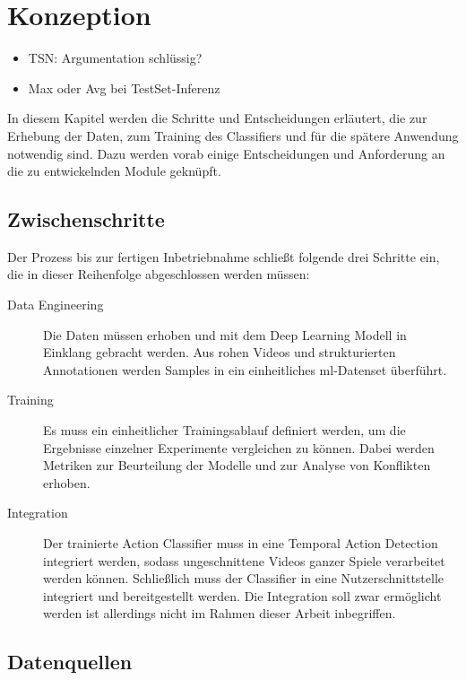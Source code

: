 \chapter{Konzeption}
\label{ch:concept}

\begin{tcolorbox}[title=Todo]
    \begin{itemize}
        \item TSN: Argumentation schlüssig?
        \item Max oder Avg bei TestSet-Inferenz
    \end{itemize}
\end{tcolorbox}

In diesem Kapitel werden die Schritte und Entscheidungen erläutert, die zur Erhebung der Daten, zum Training des Classifiers und für die spätere Anwendung notwendig sind.
Dazu werden vorab einige Entscheidungen und Anforderung an die zu entwickelnden Module geknüpft.

\section{Zwischenschritte}
\label{sec:steps}

Der Prozess bis zur fertigen Inbetriebnahme schließt folgende drei Schritte ein, die in dieser Reihenfolge abgeschlossen werden müssen:

\begin{description}
    \item[Data Engineering] Die Daten müssen erhoben und mit dem Deep Learning Modell in Einklang gebracht werden.
    Aus rohen Videos und strukturierten Annotationen werden Samples in ein einheitliches \gls{ml}-Datenset überführt.
    \item[Training] Es muss ein einheitlicher Trainingsablauf definiert werden, um die Ergebnisse einzelner Experimente vergleichen zu können.
    Dabei werden Metriken zur Beurteilung der Modelle und zur Analyse von Konflikten erhoben.
    \item[Integration] Der trainierte Action Classifier muss in eine Temporal Action Detection integriert werden, sodass ungeschnittene Videos ganzer Spiele verarbeitet werden können.
    Schließlich muss der Classifier in eine Nutzerschnittstelle integriert und bereitgestellt werden.
    Die Integration soll zwar ermöglicht werden ist allerdings nicht im Rahmen dieser Arbeit inbegriffen.
\end{description}

\section{Datenquellen}
\label{sec:datenquellen}

